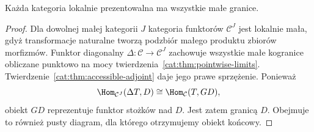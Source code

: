 \begin{wniosek}[Zupełność]\label{cat:cor:accessible-complete}
Każda kategoria lokalnie prezentowalna ma wszystkie małe granice.
\end{wniosek}
\begin{proof}
Dla dowolnej małej kategorii $J$ kategoria funktorów $\mathcal C^J$ jest lokalnie mała, gdyż transformacje naturalne tworzą podzbiór małego produktu zbiorów morfizmów. Funktor diagonalny $\Delta:\mathcal C\to\mathcal C^J$ zachowuje wszystkie małe kogranice obliczane punktowo na mocy twierdzenia~\ref{cat:thm:pointwise-limits}. Twierdzenie~\ref{cat:thm:accessible-adjoint} daje jego prawe sprzężenie. Ponieważ
\[
 \Hom_{\mathcal C^J}(\Delta T,D)
 \cong\Hom_{\mathcal C}(T,GD),
\]
obiekt $GD$ reprezentuje funktor stożków nad $D$. Jest zatem granicą $D$. Obejmuje to również pusty diagram, dla którego otrzymujemy obiekt końcowy.
\end{proof}

